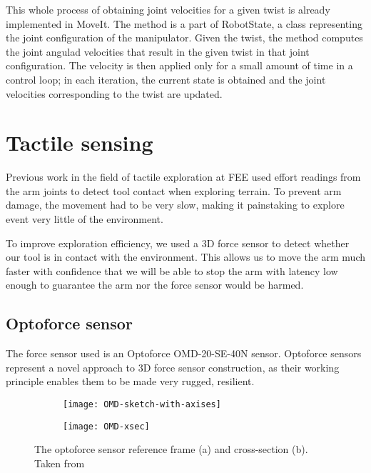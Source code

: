 \documentclass[buriama8_dp.tex]{subfiles}
\begin{document}
This whole process of obtaining joint velocities for a given twist is already implemented in MoveIt. The method is a part of RobotState, a class representing the joint configuration of the manipulator. Given the twist, the method computes the joint angulad velocities that result in the given twist in that joint configuration. The velocity is then applied only for a small amount of time in a control loop; in each iteration, the current state is obtained and the joint velocities corresponding to the twist are updated.

\section{Tactile sensing}

Previous work in the field of tactile exploration at FEE \cite{vojta} used effort readings from the arm joints to detect tool contact when exploring terrain. To prevent arm damage, the movement had to be very slow, making it painstaking to explore event very little of the environment.

To improve exploration efficiency, we used a 3D force sensor to detect whether our tool is in contact with the environment. This allows us to move the arm much faster with confidence that we will be able to stop the arm with latency low enough to guarantee the arm nor the force sensor would be harmed.

\subsection{Optoforce sensor}
\label{subsec:opto}

The force sensor used is an Optoforce OMD-20-SE-40N sensor. Optoforce sensors represent a novel approach to 3D force sensor construction, as their working principle enables them to be made very rugged, resilient.


\begin{figure}[ht]
  \begin{subfigure}[t]{0.4\textwidth}
    \texttt{[image: OMD-sketch-with-axises]}
    \caption{}
    \label{fig:omd_geom}
  \end{subfigure}
  \begin{subfigure}[t]{0.4\textwidth}
    \texttt{[image: OMD-xsec]}
    \caption{}
    \label{fig:omd_xsec}
  \end{subfigure}

  \caption[Optoforce sensor]{The optoforce sensor reference frame (a) and cross-section (b). Taken from \cite{opto_whitep}}
  \label{fig:decomps}
\end{figure}\
\end{document}
